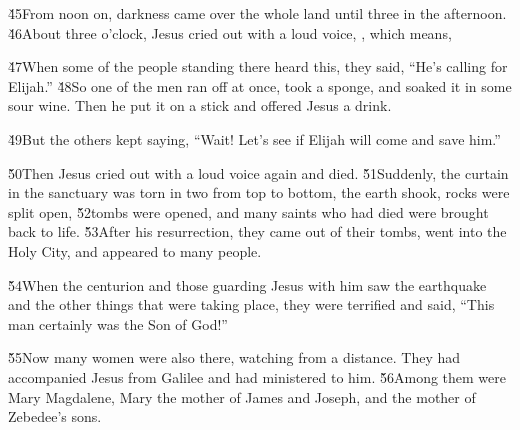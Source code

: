 \v{45}From noon on, darkness came over the whole land until three in the afternoon. \v{46}About three o'clock, Jesus cried out with a loud voice, , which means, 

\v{47}When some of the people standing there heard this, they said, ``He's calling for Elijah.'' \v{48}So one of the men ran off at once, took a sponge, and soaked it in some sour wine. Then he put it on a stick and offered Jesus a drink.

\v{49}But the others kept saying, ``Wait! Let's see if Elijah will come and save him.''

\v{50}Then Jesus cried out with a loud voice again and died. \v{51}Suddenly, the curtain in the sanctuary was torn in two from top to bottom, the earth shook, rocks were split open, \v{52}tombs were opened, and many saints who had died were brought back to life. \v{53}After his resurrection, they came out of their tombs, went into the Holy City, and appeared to many people.

\v{54}When the centurion and those guarding Jesus with him saw the earthquake and the other things that were taking place, they were terrified and said, ``This man certainly was the Son of God!''

\v{55}Now many women were also there, watching from a distance. They had accompanied Jesus from Galilee and had ministered to him. \v{56}Among them were Mary Magdalene, Mary the mother of James and Joseph, and the mother of Zebedee's sons.

